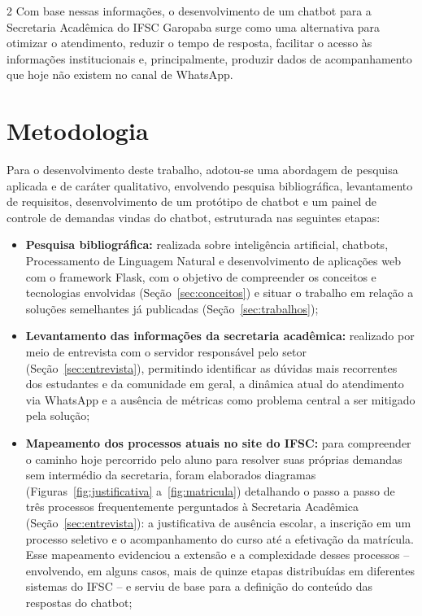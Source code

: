 \documentclass[10pt]{article}
\begin{document}
\begin{multicols}{2}
Com base nessas informações, o desenvolvimento de um chatbot para a
Secretaria Acadêmica do IFSC Garopaba surge como uma alternativa para
otimizar o atendimento, reduzir o tempo de resposta, facilitar o acesso
às informações institucionais e, principalmente, produzir dados de
acompanhamento que hoje não existem no canal de WhatsApp.

\section{Metodologia}\label{sec:metodologia}

Para o desenvolvimento deste trabalho, adotou-se uma abordagem de
pesquisa aplicada e de caráter qualitativo, envolvendo pesquisa
bibliográfica, levantamento de requisitos, desenvolvimento de um
protótipo de chatbot e um painel de controle de demandas vindas do chatbot, estruturada nas seguintes etapas:

\begin{itemize}
  

  \item \textbf{Pesquisa bibliográfica:} realizada sobre inteligência
  artificial, chatbots, Processamento de Linguagem Natural e
  desenvolvimento de aplicações web com o framework Flask, com o objetivo
  de compreender os conceitos e tecnologias envolvidas (Seção~\ref{sec:conceitos}) e situar
  o trabalho em relação a soluções semelhantes já publicadas (Seção~\ref{sec:trabalhos});

  \item \textbf{Levantamento das informações da secretaria acadêmica:}
  realizado por meio de entrevista com o servidor responsável pelo setor
  (Seção~\ref{sec:entrevista}), permitindo identificar as dúvidas mais recorrentes dos
  estudantes e da comunidade em geral, a dinâmica atual do atendimento via WhatsApp e a ausência
  de métricas como problema central a ser mitigado pela solução;

  \item \textbf{Mapeamento dos processos atuais no site do IFSC:} para
  compreender o caminho hoje percorrido pelo aluno para resolver suas
  próprias demandas sem intermédio da secretaria, foram elaborados diagramas (Figuras~\ref{fig:justificativa} a~\ref{fig:matricula}) detalhando o passo a passo de três processos frequentemente
  perguntados à Secretaria Acadêmica (Seção~\ref{sec:entrevista}): a justificativa de
  ausência escolar, a inscrição em um processo seletivo e o
  acompanhamento do curso até a efetivação da matrícula. Esse mapeamento
  evidenciou a extensão e a complexidade desses processos -- envolvendo,
  em alguns casos, mais de quinze etapas distribuídas em diferentes
  sistemas do IFSC -- e serviu de base para a definição do conteúdo das
  respostas do chatbot;


\end{itemize}
\end{multicols}
\end{document}
